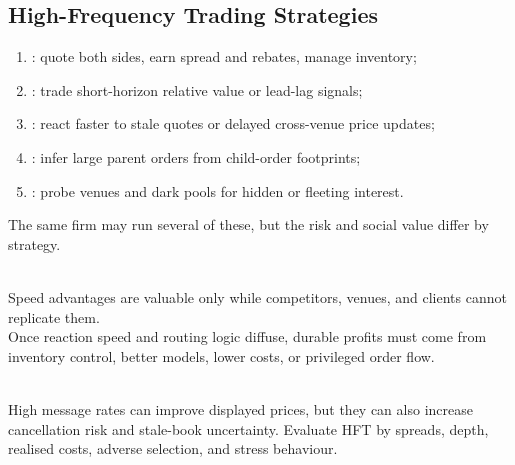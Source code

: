 \subsection{High-Frequency Trading Strategies}

\begin{taxonomy} 
\begin{enumerate}[label=\roman*.]
\setlength{\itemsep}{0pt}
\item {}: quote both sides, earn spread and rebates, manage inventory;
\item {}: trade short-horizon relative value or lead-lag signals;
\item {}: react faster to stale quotes or delayed cross-venue price updates;
\item {}: infer large parent orders from child-order footprints;
\item {}: probe venues and dark pools for hidden or fleeting interest.
\end{enumerate}
The same firm may run several of these, but the risk and social value differ by strategy.
\end{taxonomy}

\begin{principle} \\
Speed advantages are valuable only while competitors, venues, and clients cannot replicate them.\\
Once reaction speed and routing logic diffuse, durable profits must come from inventory control, better models, lower costs, or privileged order flow.
\end{principle}

\begin{caveat} \\
High message rates can improve displayed prices, but they can also increase cancellation risk and stale-book uncertainty. Evaluate HFT by spreads, depth, realised costs, adverse selection, and stress behaviour.
\end{caveat}
